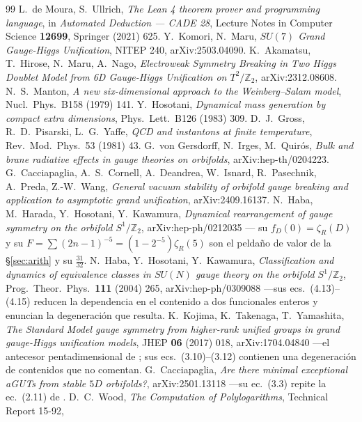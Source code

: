 \documentclass[11pt,a4paper]{article}
\newcommand{\ZZ}{\mathbb{Z}}
\begin{document}
\begin{thebibliography}{99}\scriptsize
{} L.~de Moura, S.~Ullrich, \emph{The Lean 4 theorem prover and programming language}, in \emph{Automated Deduction --- CADE 28}, Lecture Notes in Computer Science \textbf{12699}, Springer (2021) 625.
\setlength{\itemsep}{-3pt}
 Y.~Komori, N.~Maru, \emph{$SU(7)$ Grand Gauge-Higgs Unification}, NITEP 240,
arXiv:2503.04090.
 K.~Akamatsu, T.~Hirose, N.~Maru, A.~Nago, \emph{Electroweak Symmetry Breaking in Two
Higgs Doublet Model from 6D Gauge-Higgs Unification on $T^2/\ZZ_2$}, arXiv:2312.08608.
 N.~S.~Manton, \emph{A new six-dimensional approach to the Weinberg--Salam model},
Nucl.\ Phys.\ B158 (1979) 141.
 Y.~Hosotani, \emph{Dynamical mass generation by compact extra dimensions},
Phys.\ Lett.\ B126 (1983) 309.
 D.~J.~Gross, R.~D.~Pisarski, L.~G.~Yaffe, \emph{QCD and instantons at finite
temperature}, Rev.\ Mod.\ Phys.\ 53 (1981) 43.
 G.~von Gersdorff, N.~Irges, M.~Quir\'os, \emph{Bulk and brane radiative effects in
gauge theories on orbifolds}, arXiv:hep-th/0204223.
 G.~Cacciapaglia, A.~S.~Cornell, A.~Deandrea, W.~Isnard, R.~Pasechnik, A.~Preda,
Z.-W.~Wang, \emph{General vacuum stability of orbifold gauge breaking and application to asymptotic
grand unification}, arXiv:2409.16137.
 N.~Haba, M.~Harada, Y.~Hosotani, Y.~Kawamura, \emph{Dynamical rearrangement of
gauge symmetry on the orbifold $S^1/\ZZ_2$}, arXiv:hep-ph/0212035 --- su $f_D(0)=\zeta_R(D)$ y su
$F=\sum(2n-1)^{-5}=(1-2^{-5})\zeta_R(5)$ son el peldaño de valor de la \S\ref{sec:arith} y su $\tfrac{31}{32}$.
 N.~Haba, Y.~Hosotani, Y.~Kawamura, \emph{Classification and dynamics of equivalence
classes in $SU(N)$ gauge theory on the orbifold $S^1/\ZZ_2$}, Prog.\ Theor.\ Phys.\ \textbf{111}
(2004) 265, arXiv:hep-ph/0309088 ---sus ecs.~(4.13)--(4.15) reducen la dependencia en el contenido a
dos funcionales enteros y enuncian la degeneración que resulta.
 K.~Kojima, K.~Takenaga, T.~Yamashita, \emph{The Standard Model gauge symmetry from
higher-rank unified groups in grand gauge-Higgs unification models}, JHEP \textbf{06} (2017) 018,
arXiv:1704.04840 ---el antecesor pentadimensional de \cite{KM25}; sus ecs.~(3.10)--(3.12) contienen
una degeneración de contenidos que no comentan.
 G.~Cacciapaglia, \emph{Are there minimal exceptional aGUTs from stable $5D$
orbifolds?}, arXiv:2501.13118 ---su ec.~(3.3) repite la ec.~(2.11) de \cite{CCD24}.
 D.~C.~Wood, \emph{The Computation of Polylogarithms}, Technical Report 15-92,

\end{thebibliography}
\end{document}

